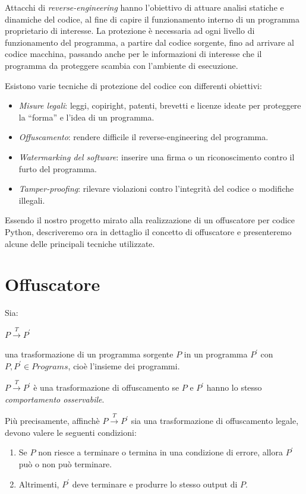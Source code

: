 \documentclass[a4paper,oneside,openright,titlepage,10pt,footinclude,headinclude]{scrbook}
\begin{document}
Attacchi di \emph{reverse-engineering} hanno l'obiettivo di attuare analisi statiche e dinamiche del codice, al fine di capire il funzionamento interno di un programma proprietario di interesse. La protezione è necessaria ad ogni livello di funzionamento del programma, a partire dal codice sorgente, fino ad arrivare al codice macchina, passando anche per le informazioni di interesse che il programma da proteggere scambia con l'ambiente di esecuzione.\medskip

\noindent Esistono varie tecniche di protezione del codice con differenti obiettivi:
\begin{itemize}
\item
\emph{Misure legali}: leggi, copiright, patenti, brevetti e licenze ideate per proteggere la ``forma'' e l'idea di un programma.
\item
\emph{Offuscamento}: rendere difficile il reverse-engineering del programma.
\item
\emph{Watermarking del software}: inserire una firma o un riconoscimento contro il furto del programma.
\item
\emph{Tamper-proofing}: rilevare violazioni contro l'integrità del codice o modifiche illegali.
\end{itemize}

Essendo il nostro progetto mirato alla realizzazione di un offuscatore per codice Python, descriveremo ora in dettaglio il concetto di offuscatore e presenteremo alcune delle principali tecniche utilizzate. 

\section{Offuscatore}

Sia:  
\begin{center}
$P \xrightarrow{T} P^{'}$
\end{center}
una trasformazione di un programma sorgente $P$ in un programma $P^{'}$
con $P, P^{'} \in Programs$, cioè l'insieme dei programmi.\medskip


\noindent $P \xrightarrow{T} P^{'}$ è una trasformazione di offuscamento se $P$ e  $P^{'}$ hanno lo stesso \emph{comportamento osservabile}.

Più precisamente, affinchè $P \xrightarrow{T} P^{'}$ sia una trasformazione di offuscamento legale, devono valere le seguenti condizioni:
\begin{enumerate}
\item
Se $P$ non riesce a terminare o termina in una condizione di errore, allora $P^{'}$ può o non può terminare.
\item
Altrimenti, $P^{'}$ deve terminare e produrre lo stesso output di $P$.
\end{enumerate}
\end{document}
